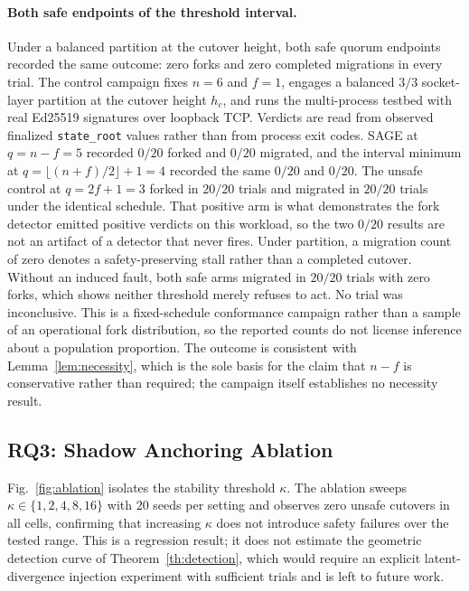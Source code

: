 \documentclass[journal]{IEEEtran}
\theoremstyle{definition}
\theoremstyle{remark}
\begin{document}
\paragraph{Both safe endpoints of the threshold interval.}
Under a balanced partition at the cutover height, both safe quorum endpoints recorded the same
outcome: zero forks and zero completed migrations in every trial. The control campaign fixes $n=6$
and $f=1$, engages a balanced $3/3$ socket-layer partition at the cutover height $h_c$, and runs the
multi-process testbed with real Ed25519 signatures over loopback TCP. Verdicts are read from observed
finalized \texttt{state\_root} values rather than from process exit codes. SAGE at $q=n-f=5$ recorded
$0/20$ forked and $0/20$ migrated, and the interval minimum at
$q=\lfloor (n+f)/2\rfloor+1=4$ recorded the same $0/20$ and $0/20$. The unsafe control at $q=2f+1=3$
forked in $20/20$ trials and migrated in $20/20$ trials under the identical schedule. That positive
arm is what demonstrates the fork detector emitted positive verdicts on this workload, so the two
$0/20$ results are not an artifact of a detector that never fires. Under partition, a migration count
of zero denotes a safety-preserving stall rather than a completed cutover. Without an induced fault,
both safe arms migrated in $20/20$ trials with zero forks, which shows neither threshold merely
refuses to act. No trial was inconclusive. This is a fixed-schedule conformance campaign rather than
a sample of an operational fork distribution, so the reported counts do not license inference about a
population proportion. The outcome is consistent with Lemma~\ref{lem:necessity}, which is the sole
basis for the claim that $n-f$ is conservative rather than required; the campaign itself establishes
no necessity result.

\subsection{RQ3: Shadow Anchoring Ablation}
Fig.~\ref{fig:ablation} isolates the stability threshold $\kappa$. The ablation sweeps
$\kappa\in\{1,2,4,8,16\}$ with $20$ seeds per setting and observes zero unsafe cutovers in all
cells, confirming that increasing $\kappa$ does not introduce safety failures over the tested
range. This is a regression result; it does not estimate the geometric detection curve of
Theorem~\ref{th:detection}, which would require an explicit latent-divergence injection
experiment with sufficient trials and is left to future work.
\end{document}
